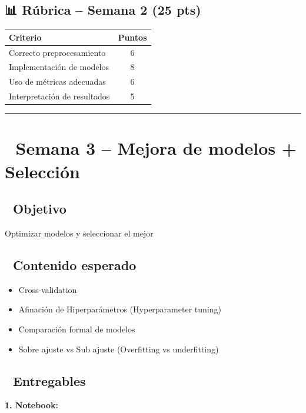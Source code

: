 \documentclass[11pt,a4paper]{article}
\begin{document}
\subsection*{📊 Rúbrica -- Semana 2 (25 pts)}

\begin{table}[H]
\centering
\begin{tabular}{lc}
\toprule
\textbf{Criterio} & \textbf{Puntos} \\
\midrule
Correcto preprocesamiento & 6 \\
Implementación de modelos & 8 \\
Uso de métricas adecuadas & 6 \\
Interpretación de resultados & 5 \\
\bottomrule
\end{tabular}
\end{table}

\hrule
\vspace{0.8cm}

\section*{📅 Semana 3 -- Mejora de modelos + Selección}

\subsection*{🎯 Objetivo}

Optimizar modelos y seleccionar el mejor

\subsection*{📌 Contenido esperado}

\begin{itemize}[leftmargin=1.5cm]
\item Cross-validation
\item Afinación de Hiperparámetros (Hyperparameter tuning)
\item Comparación formal de modelos
\item Sobre ajuste vs Sub ajuste (Overfitting vs underfitting)
\end{itemize}

\subsection*{📌 Entregables}

\textbf{1. Notebook:}
\end{document}
